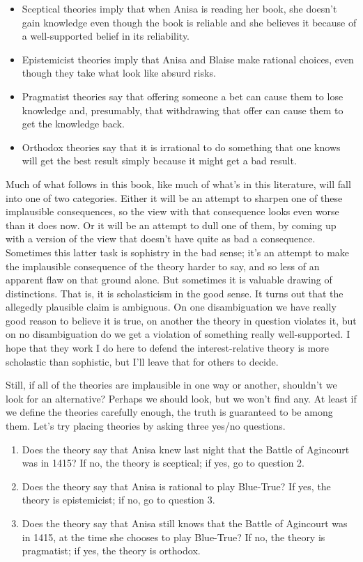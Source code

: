 \documentclass[
  11pt,
]{book}
\providecommand{\tightlist}{%
  \setlength{\itemsep}{0pt}\setlength{\parskip}{0pt}}
\begin{document}
\begin{itemize}
\tightlist
\item
  Sceptical theories imply that when Anisa is reading her book, she doesn't gain knowledge even though the book is reliable and she believes it because of a well-supported belief in its reliability.
\item
  Epistemicist theories imply that Anisa and Blaise make rational choices, even though they take what look like absurd risks.
\item
  Pragmatist theories say that offering someone a bet can cause them to lose knowledge and, presumably, that withdrawing that offer can cause them to get the knowledge back.
\item
  Orthodox theories say that it is irrational to do something that one knows will get the best result simply because it might get a bad result.
\end{itemize}

Much of what follows in this book, like much of what's in this literature, will fall into one of two categories. Either it will be an attempt to sharpen one of these implausible consequences, so the view with that consequence looks even worse than it does now. Or it will be an attempt to dull one of them, by coming up with a version of the view that doesn't have quite as bad a consequence. Sometimes this latter task is sophistry in the bad sense; it's an attempt to make the implausible consequence of the theory harder to say, and so less of an apparent flaw on that ground alone. But sometimes it is valuable drawing of distinctions. That is, it is scholasticism in the good sense. It turns out that the allegedly plausible claim is ambiguous. On one disambiguation we have really good reason to believe it is true, on another the theory in question violates it, but on no disambiguation do we get a violation of something really well-supported. I hope that they work I do here to defend the interest-relative theory is more scholastic than sophistic, but I'll leave that for others to decide.

Still, if all of the theories are implausible in one way or another, shouldn't we look for an alternative? Perhaps we should look, but we won't find any. At least if we define the theories carefully enough, the truth is guaranteed to be among them. Let's try placing theories by asking three yes/no questions.

\begin{enumerate}
\def\labelenumi{\arabic{enumi}.}
\tightlist
\item
  Does the theory say that Anisa knew last night that the Battle of Agincourt was in 1415? If no, the theory is sceptical; if yes, go to question 2.
\item
  Does the theory say that Anisa is rational to play Blue-True? If yes, the theory is epistemicist; if no, go to question 3.
\item
  Does the theory say that Anisa still knows that the Battle of Agincourt was in 1415, at the time she chooses to play Blue-True? If no, the theory is pragmatist; if yes, the theory is orthodox.
\end{enumerate}
\end{document}
